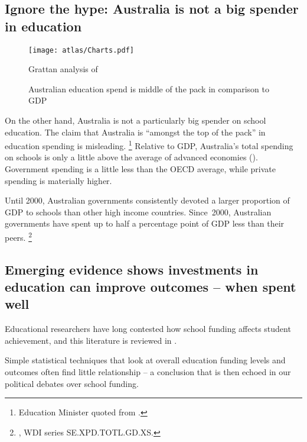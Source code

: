 \documentclass{grattan}
\begin{document}
\subsection{Ignore the hype: Australia is not a big spender in education }\label{subsec:ignore-the-hype-australia-is-not-a-big-spender-in-education}
\begin{figure}
\caption{Australian education spend is middle of the pack in comparison to GDP\label{fig:Aust-edu-spend-is-middle-of-pack}}

\texttt{[image: atlas/Charts.pdf]}

%
{Grattan analysis of \textcite[][207]{OECD2016EducationGlance2016}}
\end{figure}

On the other hand, Australia is not a particularly big spender on school education.
The claim that Australia is ``amongst the top of the pack'' in education spending is misleading.%
\footnote{Education Minister quoted from \textcite{Conifer2016GlobalEducationReport}.}
Relative to GDP, Australia's total spending on schools is only a little above the average of advanced economies ().
Government spending is a little less than the OECD average, while private spending is materially higher.

Until 2000, Australian governments consistently devoted a larger proportion of GDP to schools than other high income countries.
Since~2000, Australian governments have spent up to half a percentage point of GDP less than their peers.%
\footnote{\textcite{WorldBank2016WordDevelopmentIndicators}, WDI series SE.XPD.TOTL.GD.XS.}

\subsection{Emerging evidence shows investments in education can improve outcomes -- when spent well}\label{subsec:emerging-evidence-shows-investments-in-education-can-improve-outcomes}

Educational researchers have long contested how school funding affects student achievement, and this literature is reviewed in .

Simple statistical techniques that look at overall education funding levels and outcomes often find little relationship -- a conclusion that is then echoed in our political debates over school funding.
\end{document}
